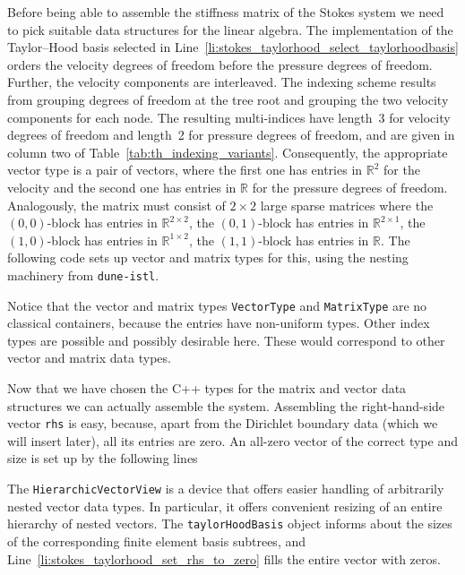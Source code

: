 \documentclass[a4paper,10pt,headings=normal,bibliography=totoc]{scrartcl}
\newcommand{\cpp}[1]{\lstinline[basicstyle=\ttfamily]!#1!}
\newcommand{\dunemodule}[1]{\texttt{#1}}
\begin{document}
Before being able to assemble the stiffness matrix of the Stokes system we need to pick suitable data structures
for the linear algebra.
The implementation of the Taylor--Hood basis selected in Line~\ref{li:stokes_taylorhood_select_taylorhoodbasis} orders the
velocity degrees of freedom before the pressure degrees of freedom.  Further, the velocity
components are interleaved.  The indexing scheme results from grouping degrees of freedom at the
tree root and grouping the two velocity components for each node. The resulting multi-indices
have length~3 for velocity degrees of freedom and length~2 for pressure degrees of freedom,
and are given in column two of Table~\ref{tab:th_indexing_variants}.
Consequently, the appropriate vector type is a pair of vectors, where the first one
has entries in $\mathbb{R}^2$ for the velocity and the second one has entries in $\mathbb{R}$
for the pressure degrees of freedom.  Analogously, the matrix must consist of
$2 \times 2$ large sparse matrices where
the $(0,0)$-block has entries in $\mathbb{R}^{2\times 2}$,
the $(0,1)$-block has entries in $\mathbb{R}^{2\times 1}$,
the $(1,0)$-block has entries in $\mathbb{R}^{1\times 2}$,
the $(1,1)$-block has entries in $\mathbb{R}$.
The following code sets up vector and matrix types for this,
using the nesting machinery from \dunemodule{dune-istl}.
%

%
Notice that the vector and matrix types \cpp{VectorType} and \cpp{MatrixType}
are no classical containers, because the entries have non-uniform types.
Other index types are possible and possibly desirable here.  These would correspond to other vector and
matrix data types.

Now that we have chosen the C++ types for the matrix and vector data structures we can actually assemble the system.
Assembling the right-hand-side vector \cpp{rhs} is easy, because, apart from the Dirichlet boundary data (which we
will insert later), all its entries are zero.  An all-zero vector of the correct type and size is set up by the
following lines
%

%
The \cpp{HierarchicVectorView} is a device that offers easier handling of arbitrarily nested vector data types.
In particular, it offers convenient resizing of an entire hierarchy of nested vectors.
The \cpp{taylorHoodBasis} object informs about the sizes of the corresponding finite element basis subtrees,
and Line~\ref{li:stokes_taylorhood_set_rhs_to_zero} fills the entire vector with zeros.
\end{document}
